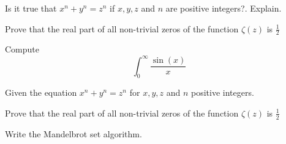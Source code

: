 \documentclass[addpoints,a4paper]{exam}
\date{May 1, 2021}
\begin{document}
\maketitle

\begin{questions}

    \question Is it true that \(x^n + y^n = z^n\) if \(x,y,z\) and \(n\) are positive integers?. Explain.
    
    \question Prove that the real part of all non-trivial zeros of the function \(\zeta(z)\) is \(\frac{1}{2}\)
    
    \question Compute \[\int_{0}^{\infty} \frac{\sin(x)}{x}\]
    

    \question Given the equation \(x^n + y^n = z^n\) for \(x,y,z\) and \(n\) positive integers. 

    \question Prove that the real part of all non-trivial zeros of the function 
    \(\zeta(z)\) is \(\frac{1}{2}\)

    \question Write the Mandelbrot set algorithm.

    \vspace{3in}

    \end{questions}
\end{document}
